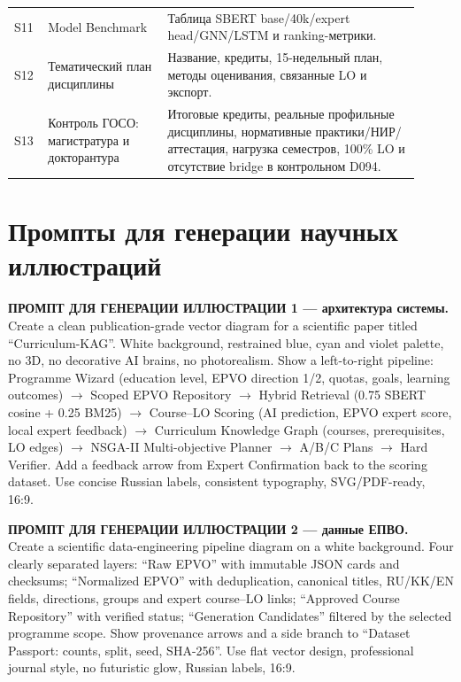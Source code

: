 \documentclass[twoside,11pt]{article}
\begin{document}
\begin{longtable}{p{0.06\linewidth}p{0.27\linewidth}p{0.58\linewidth}}
S11 & Model Benchmark &
Таблица SBERT base/40k/expert head/GNN/LSTM и ranking-метрики.\\

S12 & Тематический план дисциплины &
Название, кредиты, 15-недельный план, методы оценивания, связанные LO и экспорт.\\

S13 & Контроль ГОСО: магистратура и докторантура &
Итоговые кредиты, реальные профильные дисциплины, нормативные практики/НИР/аттестация, нагрузка семестров, 100\% LO и отсутствие bridge в контрольном D094.\\
\bottomrule
\end{longtable}

\section{Промпты для генерации научных иллюстраций}
\label{app:prompts}

\noindent\colorbox{yellow!25}{\parbox{0.96\linewidth}{
\textbf{ПРОМПТ ДЛЯ ГЕНЕРАЦИИ ИЛЛЮСТРАЦИИ 1 --- архитектура системы.}\\
Create a clean publication-grade vector diagram for a scientific paper titled
``Curriculum-KAG''. White background, restrained blue, cyan and violet palette,
no 3D, no decorative AI brains, no photorealism. Show a left-to-right pipeline:
Programme Wizard (education level, EPVO direction 1/2, quotas, goals, learning
outcomes) $\rightarrow$ Scoped EPVO Repository $\rightarrow$ Hybrid Retrieval
(0.75 SBERT cosine + 0.25 BM25) $\rightarrow$ Course--LO Scoring (AI prediction,
EPVO expert score, local expert feedback) $\rightarrow$ Curriculum Knowledge
Graph (courses, prerequisites, LO edges) $\rightarrow$ NSGA-II Multi-objective
Planner $\rightarrow$ A/B/C Plans $\rightarrow$ Hard Verifier. Add a feedback
arrow from Expert Confirmation back to the scoring dataset. Use concise Russian
labels, consistent typography, SVG/PDF-ready, 16:9.
}}

\medskip
\noindent\colorbox{yellow!25}{\parbox{0.96\linewidth}{
\textbf{ПРОМПТ ДЛЯ ГЕНЕРАЦИИ ИЛЛЮСТРАЦИИ 2 --- данные ЕПВО.}\\
Create a scientific data-engineering pipeline diagram on a white background.
Four clearly separated layers: ``Raw EPVO'' with immutable JSON cards and
checksums; ``Normalized EPVO'' with deduplication, canonical titles, RU/KK/EN
fields, directions, groups and expert course--LO links; ``Approved Course
Repository'' with verified status; ``Generation Candidates'' filtered by the
selected programme scope. Show provenance arrows and a side branch to
``Dataset Passport: counts, split, seed, SHA-256''. Use flat vector design,
professional journal style, no futuristic glow, Russian labels, 16:9.
}}
\end{document}
